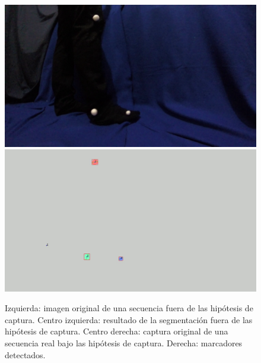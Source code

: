 \begin{figure}[ht!]
        {\includegraphics[scale=0.07]{imagenes/orig.png}\label{abelvideo2}}\hspace{1 mm}
        {\includegraphics[scale=0.07]{imagenes/detect.png}
        \label{abeldetect}}
      \caption{%
       Izquierda: imagen original de una secuencia fuera de las hipótesis de captura. 
       Centro izquierda: resultado de la segmentación fuera de las hipótesis de captura.
       Centro derecha: captura original de una secuencia real bajo las hipótesis de captura.
        Derecha: marcadores detectados.}  
      \label{ejemploabelumbr2}
\end{figure}
